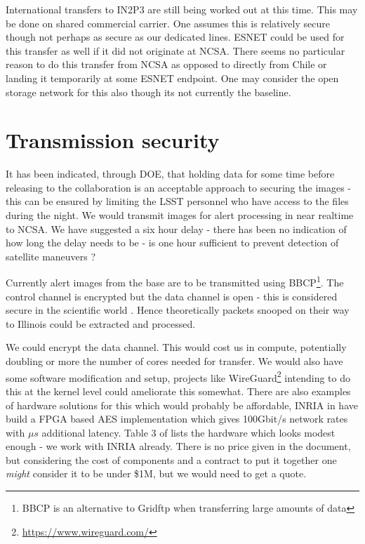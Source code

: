 International transfers to IN2P3 are still being worked out at this time. This may be done on shared commercial carrier. One assumes
this is relatively secure though not perhaps as secure as our dedicated lines. ESNET could be used for this transfer as well if it did not originate at NCSA. There seems no particular reason to do this transfer from NCSA as opposed to directly from Chile or landing it
temporarily at some ESNET endpoint. One may consider the open storage network \citep{osn} for this also though its not currently the baseline.


\section{Transmission security} \label{sec:trans}

It has been indicated, through DOE, that holding data for some time before releasing to the collaboration is an acceptable approach to securing the images - this can be ensured by limiting the LSST personnel who have access to the files during the night.
We would transmit images for alert processing in near realtime to NCSA. We have suggested a six hour delay - there has been no indication of how long the delay needs to be - is one hour sufficient to prevent detection of satellite maneuvers ?

Currently alert images from the base are to be transmitted using BBCP\footnote{BBCP is an alternative to Gridftp when transferring large amounts of data}. The control channel is encrypted but the data channel is open - this is considered secure in the scientific world \citep{bbcp}. Hence theoretically packets snooped on their way to Illinois could be extracted and processed.


We could encrypt the data  channel. This would cost us in  compute, potentially  doubling or more the number of cores needed for transfer. We would also have some software modification and setup, projects like WireGuard\footnote{\url{https://www.wireguard.com/}} intending to do this at the kernel level could ameliorate this somewhat.
There are also  examples of hardware solutions for this which would probably be affordable, INRIA in \cite{10.1007/978-3-642-45073-0_1} have build a FPGA based AES\cite{aes} implementation  which gives 100Gbit/s network rates with $\mu s$ additional latency. Table 3 of \cite{10.1007/978-3-642-45073-0_1} lists the hardware which looks modest enough - we work with INRIA already. There is no price given in the document, but considering the cost of components and a contract to put it together one \emph{might} consider it to be  under \$1M, but we would need to get a quote.

